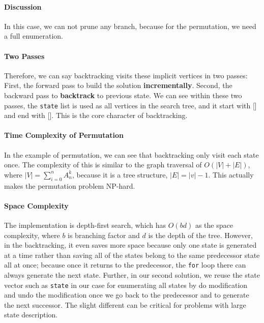 \documentclass[../main.tex]{subfiles}
\begin{document}
\paragraph{Discussion} In this case, we can not prune any branch, because for the permutation, we need a full enumeration. 

\paragraph{Two Passes} Therefore, we can say backtracking visits these implicit vertices
in two passes: First, the forward pass to build the solution \textbf{incrementally}.
Second, the backward pass to \textbf{backtrack} to previous state. We can see within
these two passes, the \texttt{state} list is used as all vertices in the search tree, and
it start with [] and end with []. This is the core character of backtracking.

\paragraph{Time Complexity of Permutation}
In the example of permutation, we can see that backtracking only visit each state once. The complexity of this is similar to the graph traversal of $O(|V|+|E|)$, where $|V| = \sum_{i=0}^{n}{A_{n}^{k}}$, because it is a tree structure, $|E| = |v|-1$. This actually makes the permutation problem NP-hard. 

\paragraph{Space Complexity} The implementation is depth-first search, which has $O(bd)$ as the space complexity, where $b$ is branching factor and $d$ is the depth of the tree. However, in the backtracking, it even saves more space because only one state is generated at a time rather than saving all of the states belong to the same predecessor state all at once; because once it returns to the predecessor, the \texttt{for} loop there can always generate the next state. Further, in our second solution, we  reuse the state vector such as \texttt{state} in our case for enumerating all states by do modification and undo the modification once we go back to the predecessor and to generate the next successor. The slight different can be critical for problems with large state description.  
\end{document}
